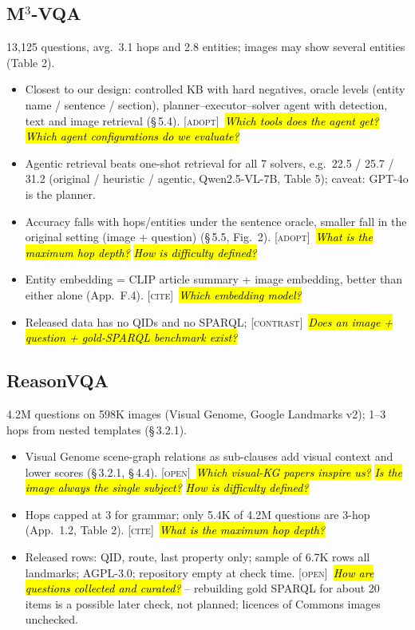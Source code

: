 \documentclass[10pt,a4paper]{article}
\newcommand{\adopt}{\textsc{[adopt]}}
\newcommand{\contrast}{\textsc{[contrast]}}
\newcommand{\cit}{\textsc{[cite]}}
\newcommand{\open}{\textsc{[open]}}
\newcommand{\q}[1]{\hl{\footnotesize\itshape #1}}
\begin{document}
\subsection*{M$^3$-VQA \cite{ma2026m3}}
13,125 questions, avg.\ 3.1 hops and 2.8 entities; images may show
several entities (Table 2).
\begin{itemize}
  \item Closest to our design: controlled KB with hard negatives,
    oracle levels (entity name / sentence / section),
    planner--executor--solver agent with detection, text and image
    retrieval (\S\,5.4). \adopt\ \q{Which tools does the agent get?}
    \q{Which agent configurations do we evaluate?}
  \item Agentic retrieval beats one-shot retrieval for all 7 solvers,
    e.g.\ 22.5 / 25.7 / 31.2 (original / heuristic / agentic,
    Qwen2.5-VL-7B, Table 5); caveat: GPT-4o is the planner.
  \item Accuracy falls with hops/entities under the sentence oracle,
    smaller fall in the original setting (image + question) (\S\,5.5,
    Fig.~2). \adopt\ \q{What is the maximum hop depth?} \q{How is
    difficulty defined?}
  \item Entity embedding = CLIP article summary + image embedding,
    better than either alone (App.~F.4). \cit\ \q{Which embedding model?}
  \item Released data has no QIDs and no SPARQL; \contrast\ \q{Does
    an image + question + gold-SPARQL benchmark exist?}
\end{itemize}

\subsection*{ReasonVQA \cite{tran2025reasonvqa}}
4.2M questions on 598K images (Visual Genome, Google Landmarks v2);
1--3 hops from nested templates (\S\,3.2.1).
\begin{itemize}
  \item Visual Genome scene-graph relations as sub-clauses add visual
    context and lower scores (\S\,3.2.1, \S\,4.4). \open\ \q{Which
    visual-KG papers inspire us?} \q{Is the image always the single
    subject?} \q{How is difficulty defined?}
  \item Hops capped at 3 for grammar; only 5.4K of 4.2M questions are
    3-hop (App.~1.2, Table 2). \cit\ \q{What is the maximum hop depth?}
  \item Released rows: QID, route, last property only; sample of 6.7K
    rows all landmarks; AGPL-3.0; repository empty at check time.
    \open\ \q{How are questions collected and curated?} -- rebuilding
    gold SPARQL for about 20 items is a possible later check, not
    planned; licences of Commons images unchecked.
\end{itemize}
\end{document}

